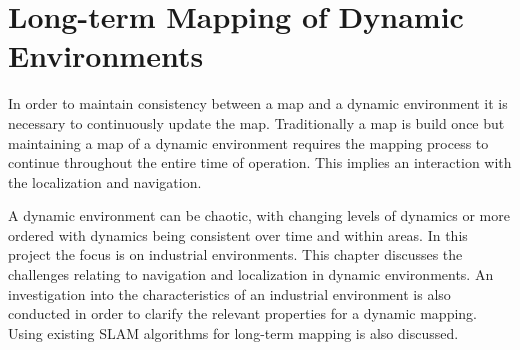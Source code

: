 \chapter{Long-term Mapping of Dynamic Environments}
\label{long_term_mapping}

In order to maintain consistency between a map and a dynamic environment it is necessary to continuously update the map. Traditionally a map is build once but maintaining a map of a dynamic environment requires the mapping process to continue throughout the entire time of operation. This implies an interaction with the localization and navigation. 

A dynamic environment can be chaotic, with changing levels of dynamics or more ordered with dynamics being consistent over time and within areas. In this project the focus is on industrial environments.
This chapter discusses the challenges relating to navigation and localization in dynamic environments. An investigation into the characteristics of an industrial environment is also conducted in order to clarify the relevant properties for a dynamic mapping. Using existing SLAM algorithms for long-term mapping is also discussed. 







